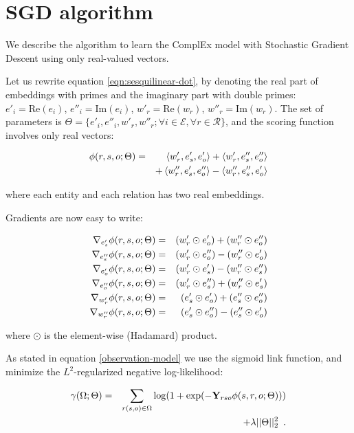 \documentclass{article}
\newcommand{\grad}{\nabla}
\newcommand{\real}{\mathrm{Re}}
\newcommand{\imag}{\mathrm{Im}}
\newcommand{\ObsTensor}{\mathbf{Y}}
\newcommand{\setent}{\mathcal{E}} %
\newcommand{\setrel}{\mathcal{R}} %
\begin{document}
\appendix


\section{SGD algorithm}
\label{app:sgd}
We describe the algorithm to learn the ComplEx model with Stochastic Gradient Descent using only real-valued vectors.

Let us rewrite equation \ref{eqn:sesquilinear-dot}, by denoting
the real part of embeddings with primes and the imaginary part with double primes: 
$e'_i = \real(e_i)$, $e''_i = \imag(e_i)$, $w'_r = \real(w_r)$, $w''_r = \imag(w_r)$.
The set of parameters is $\Theta=\{e'_i,e''_i,w'_r,w''_r; \forall
i \in \setent, \forall r \in \setrel \}$,
and the scoring function involves only real vectors:

\begin{eqnarray}
\phi(r,s,o;\Theta) &=& \left<w'_r,e'_s, e'_o\right>+ \left<w'_r,e''_s, e''_o\right> \notag\\
    &&+ \left<w''_r, e'_s, e''_o\right> - \left<w''_r,e''_s, e'_o\right>\notag
\end{eqnarray}

where each entity and each relation has two real embeddings. 


Gradients are now easy to write:


\begin{eqnarray}
\label{gradients}
\grad_{e'_s} \phi(r,s,o;\Theta) &=& (w'_r \odot e'_o) + (w''_r \odot e''_o)\notag\\
\grad_{e''_s} \phi(r,s,o;\Theta) &=& (w'_r \odot e''_o) - (w''_r \odot e'_o)\notag\\
\grad_{e'_o} \phi(r,s,o;\Theta) &=& (w'_r \odot e'_s) - (w''_r \odot e''_s)\notag\\
\grad_{e''_o} \phi(r,s,o;\Theta) &=& (w'_r \odot e''_s) + (w''_r \odot e'_s)\notag\\
\grad_{w'_r} \phi(r,s,o;\Theta) &=& (e'_s \odot e'_o) + (e''_s \odot e''_o)\notag\\
\grad_{w''_r} \phi(r,s,o;\Theta) &=& (e'_s \odot e''_o) - (e''_s \odot e'_o)\notag
\end{eqnarray}

where $\odot$ is the element-wise (Hadamard) product.


As stated in equation \ref{observation-model} we use the sigmoid link function, and minimize the $L^2$-regularized negative log-likelihood:

\begin{eqnarray}
    \gamma(\Omega;\Theta) &=&
    \sum_{r(s,o) \in \Omega} \log( 1 + \exp(-\ObsTensor_{rso}\phi(s,r,o;\Theta)))\notag\\
    &&+ \lambda ||\Theta||^2_2\enspace.\notag
\end{eqnarray}
\end{document}
